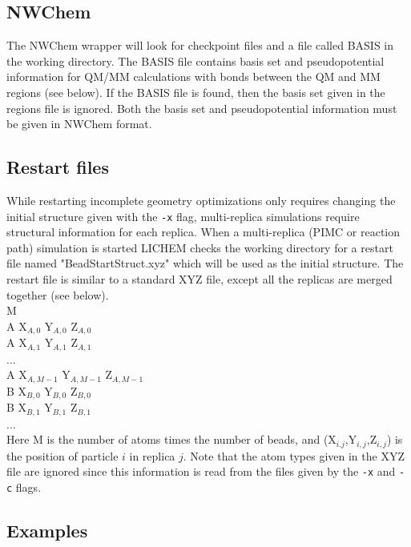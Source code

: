 \documentclass[12pt]{report}
\begin{document}
\subsection{NWChem}

The NWChem wrapper will look for checkpoint files and a file called BASIS in
the working directory.
The BASIS file contains basis set and pseudopotential information for QM/MM
calculations with bonds between the QM and MM regions (see below).
If the BASIS file is found, then the basis set given in the regions file is
ignored.
Both the basis set and pseudopotential information must be given in NWChem
format.

\subsection{Restart files}

While restarting incomplete geometry optimizations only requires changing
the initial structure given with the \texttt{-x} flag, multi-replica simulations
require structural information for each replica.
When a multi-replica (PIMC or reaction path) simulation is started LICHEM
checks the working directory for a restart file named "BeadStartStruct.xyz"
which will be used as the initial structure.
The restart file is similar to a standard XYZ file, except all the replicas
are merged together (see below). \\

M \\

A  X$_{A,0}$  Y$_{A,0}$  Z$_{A,0}$ \\
A  X$_{A,1}$  Y$_{A,1}$  Z$_{A,1}$ \\
... \\
A  X$_{A,M-1}$  Y$_{A,M-1}$  Z$_{A,M-1}$ \\
B  X$_{B,0}$  Y$_{B,0}$  Z$_{B,0}$ \\
B  X$_{B,1}$  Y$_{B,1}$  Z$_{B,1}$ \\
... \\

Here M is the number of atoms times the number of beads, and
(X$_{i.j}$,Y$_{i,j}$,Z$_{i,j}$) is the position of particle $i$ in replica
$j$.
Note that the atom types given in the XYZ file are ignored since this
information is read from the files given by the \texttt{-x} and \texttt{-c} flags.

\subsection{Examples}
\end{document}
